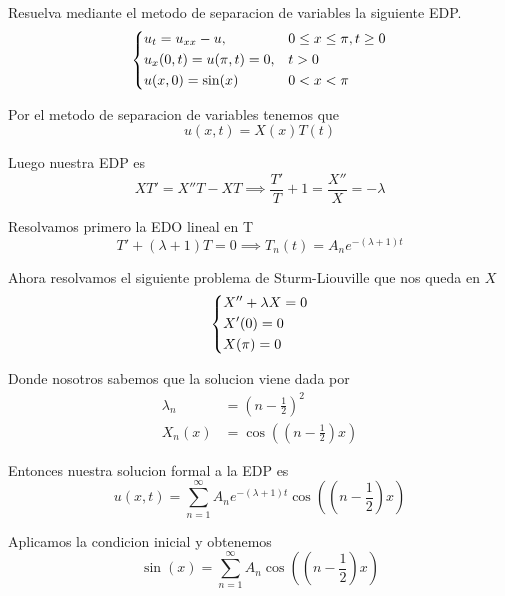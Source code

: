\message{ !name(MAT024.tex)}\documentclass[../main.tex]{subfiles}
\begin{document}
\begin{problem}
  Resuelva mediante el metodo de separacion de variables la siguiente EDP.
  \begin{equation*}
  \begin{dcases}
    u_t = u_{xx} - u, & 0 \leq x \leq \pi, t \geq 0\\
    u_x(0, t) = u(\pi, t) = 0, & t > 0\\
    u(x, 0) = \sin(x) & 0 < x < \pi
  \end{dcases}
  \end{equation*}
\end{problem}
\begin{solution}
  Por el metodo de separacion de variables tenemos que
  \begin{equation*}
    u(x, t) = X(x)T(t)
  \end{equation*}

  Luego nuestra EDP es
  \begin{equation*}
    XT' = X''T - XT \implies \frac{T'}{T} + 1 = \frac{X''}{X} = -\lambda
  \end{equation*}

  Resolvamos primero la EDO lineal en T
  \begin{equation*}
    T' + (\lambda + 1)T = 0 \implies T_{n}(t) = A_{n}e^{-(\lambda + 1) t}
  \end{equation*}

  Ahora resolvamos el siguiente problema de Sturm-Liouville que nos queda en $X$
  \begin{equation*}
    \begin{dcases}
      X'' + \lambda X = 0\\
      X'(0) = 0\\
      X(\pi) = 0
    \end{dcases}
  \end{equation*}

  Donde nosotros sabemos que la solucion viene dada por
  \begin{align*}
    \lambda_{n} &= (n - \frac12)^{2}\\
    X_{n}(x) &= \cos((n - \frac12)x)
  \end{align*}

  Entonces nuestra solucion formal a la EDP es
  \begin{equation*}
    u(x, t) = \sum_{n = 1}^{\infty} A_{n}e^{-(\lambda + 1)t}\cos((n - \frac12)x)
  \end{equation*}

  Aplicamos la condicion inicial y obtenemos
  \begin{equation*}
    \sin(x) = \sum_{n = 1}^{\infty} A_{n}\cos((n - \frac{1}{2})x)
  \end{equation*}


\end{solution}
\end{document}
